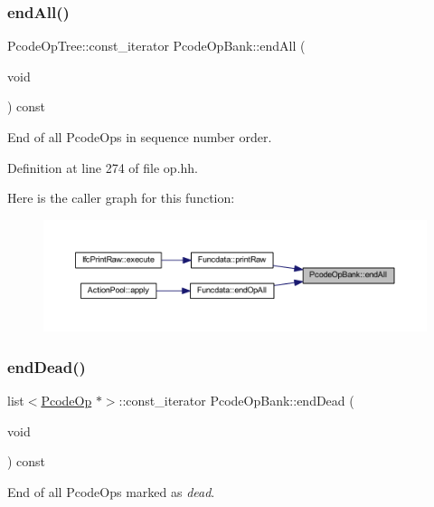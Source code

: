\subsubsection{\texorpdfstring{endAll()}{endAll()}}
{\footnotesize\ttfamily Pcode\+Op\+Tree\+::const\+\_\+iterator Pcode\+Op\+Bank\+::end\+All (\begin{DoxyParamCaption}\item[{void}]{ }\end{DoxyParamCaption}) const\hspace{0.3cm}{\ttfamily [inline]}}



End of all Pcode\+Ops in sequence number order. 



Definition at line 274 of file op.\+hh.

Here is the caller graph for this function\+:
\nopagebreak
\begin{figure}[H]
\begin{center}
\leavevmode
\includegraphics[width=350pt]{class_pcode_op_bank_aa651dcad6047a32b0e46423f96c80016_icgraph}
\end{center}
\end{figure}
\mbox{\label{class_pcode_op_bank_a4827b640a1414da1049f7ee59460f71c}} 
\subsubsection{\texorpdfstring{endDead()}{endDead()}}
{\footnotesize\ttfamily list$<$\mbox{\hyperlink{class_pcode_op}{Pcode\+Op}} $\ast$$>$\+::const\+\_\+iterator Pcode\+Op\+Bank\+::end\+Dead (\begin{DoxyParamCaption}\item[{void}]{ }\end{DoxyParamCaption}) const\hspace{0.3cm}{\ttfamily [inline]}}



End of all Pcode\+Ops marked as {\itshape dead}. 



